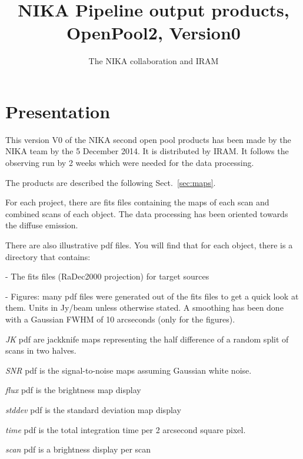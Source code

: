 \documentclass[a4paper,10pt]{article}
\title{NIKA Pipeline output products, OpenPool2, Version0}
\author{The NIKA collaboration and IRAM}
\begin{document}
\maketitle


\section{Presentation}

This version V0 of the NIKA second open pool products has been made by the
NIKA team by the 5 December 2014.  It is distributed by IRAM. It follows the
observing run by 2 weeks which were needed for the data processing.

The products are described the following Sect.~\ref{sec:maps}.

For each project, there are fits files containing the maps of each scan and
combined scans of each object. The data processing has been oriented towards
the diffuse emission.

There are also illustrative pdf files. You will find that for each object,
there is a directory that contains:

- The fits files (RaDec2000 projection) for target sources

- Figures: many pdf files were generated out of the fits files to get a quick
look at them. Units in Jy/beam unless otherwise stated. A smoothing has been
done with a Gaussian FWHM of 10 arcseconds (only for the figures). 

{\sl JK} pdf are jackknife maps representing the half difference of a random split
of scans in two halves.

{\sl SNR} pdf is the signal-to-noise maps assuming Gaussian white noise.

{\sl flux} pdf is the brightness map display

{\sl stddev} pdf is the standard deviation map display

{\sl time} pdf is the total integration time per 2 arcsecond square pixel.

{\sl scan} pdf is a brightness display per scan
\end{document}
